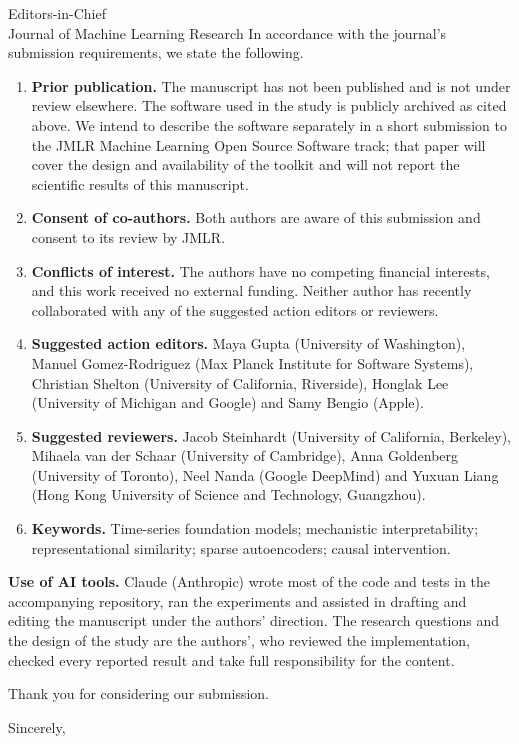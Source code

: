 \documentclass[11pt]{letter}
\begin{document}
\begin{letter}{Editors-in-Chief\\
Journal of Machine Learning Research}
In accordance with the journal's submission requirements, we state the following.
\begin{enumerate}
\item \textbf{Prior publication.} The manuscript has not been published and is not under review elsewhere. The software used in the study is publicly archived as cited above. We intend to describe the software separately in a short submission to the JMLR Machine Learning Open Source Software track; that paper will cover the design and availability of the toolkit and will not report the scientific results of this manuscript.
\item \textbf{Consent of co-authors.} Both authors are aware of this submission and consent to its review by JMLR.
\item \textbf{Conflicts of interest.} The authors have no competing financial interests, and this work received no external funding. Neither author has recently collaborated with any of the suggested action editors or reviewers.
\item \textbf{Suggested action editors.} Maya Gupta (University of Washington), Manuel Gomez-Rodriguez (Max Planck Institute for Software Systems), Christian Shelton (University of California, Riverside), Honglak Lee (University of Michigan and Google) and Samy Bengio (Apple).
\item \textbf{Suggested reviewers.} Jacob Steinhardt (University of California, Berkeley), Mihaela van der Schaar (University of Cambridge), Anna Goldenberg (University of Toronto), Neel Nanda (Google DeepMind) and Yuxuan Liang (Hong Kong University of Science and Technology, Guangzhou).
\item \textbf{Keywords.} Time-series foundation models; mechanistic interpretability; representational similarity; sparse autoencoders; causal intervention.
\end{enumerate}

\textbf{Use of AI tools.} Claude (Anthropic) wrote most of the code and tests in the accompanying repository, ran the experiments and assisted in drafting and editing the manuscript under the authors' direction. The research questions and the design of the study are the authors', who reviewed the implementation, checked every reported result and take full responsibility for the content.

Thank you for considering our submission.

\closing{Sincerely,}

\end{letter}
\end{document}
